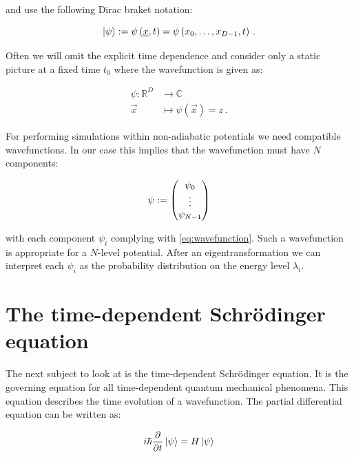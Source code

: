 and use the following Dirac braket notation:

\begin{equation}
  \Ket{\psi} := \psi\left(\underline{x}, t\right) = \psi\left(x_0, \ldots, x_{D-1}, t\right) \,.
\end{equation}

Often we will omit the explicit time dependence and consider only a static
picture at a fixed time $t_0$ where the wavefunction is given as:

\begin{equation}
\begin{split}
  \psi : \mathbb{R}^D & \rightarrow \mathbb{C} \\
         \vec{x}      & \mapsto     \psi(\vec{x}) = z \,.
\end{split}
\end{equation}

For performing simulations within non-adiabatic potentials we need compatible
wavefunctions. In our case this implies that the wavefunction must have $N$
components:

\begin{equation}
  \psi :=
  \begin{pmatrix}
    \psi_0 \\
    \vdots \\
    \psi_{N-1}
  \end{pmatrix}
\end{equation}

with each component $\psi_i$ complying with \eqref{eq:wavefunction}. Such a
wavefunction is appropriate for a $N$-level potential. After an eigentransformation
we can interpret each $\psi_i$ as the probability distribution on the energy level
$\lambda_i$.


\section{The time-dependent Schrödinger equation}


The next subject to look at is the time-dependent Schrödinger equation.
It is the governing equation for all time-dependent quantum mechanical
phenomena. This equation describes the time evolution of a wavefunction.
The partial differential equation can be written as:

\begin{equation} \label{eq:basics_tdse_simple}
  i \hbar \frac{\partial}{\partial t} \Ket{\psi} = H \Ket{\psi}
\end{equation}

